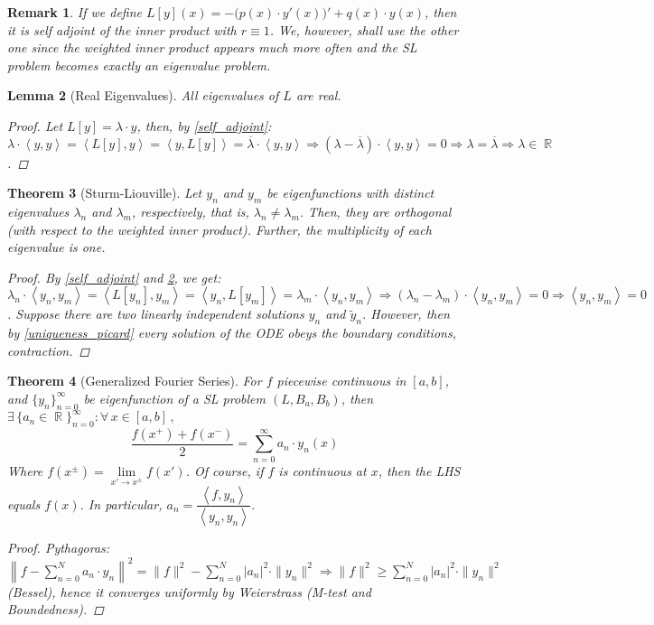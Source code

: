 \documentclass[12pt]{article}
\let\RA\Rightarrow
\newcommand{\Forall}[1]{\forall\,{#1}\,,\,}
\newcommand{\Exist}[1]{\exists\,{#1}:}
\DeclareMathOperator{\R}{\mathbb{R}}
\newcommand{\inner}[2]{\left\langle{#1},{#2}\right\rangle}
\newtheorem{theorem}{Theorem}[subsection]
\newtheorem{lemma}[theorem]{Lemma}
\newtheorem{remark}[theorem]{Remark}
\begin{document}
\begin{remark}
  If we define $L[y](x)=-\Big(p(x)\cdot y'(x)\Big)'+q(x)\cdot y(x)$, then it is self adjoint of the inner product with $r\equiv 1$. We, however, shall use the other one since the weighted inner product appears much more often and the SL problem becomes exactly an eigenvalue problem.
\end{remark}

\begin{lemma}[Real Eigenvalues]
  \label{real_eigen}
  All eigenvalues of $L$ are real.
  \begin{proof}
    Let $L[y]=\lambda\cdot y$, then, by \ref{self_adjoint}: $\lambda\cdot\inner{y}{y}=\inner{L[y]}{y}=\inner{y}{L[y]}=\overline{\lambda}\cdot\inner{y}{y}\RA(\lambda-\overline{\lambda})\cdot\inner{y}{y}=0\RA\lambda=\overline{\lambda}\RA \lambda\in\R$.
  \end{proof}
\end{lemma}

\begin{theorem}[Sturm-Liouville]
  Let $y_n$ and $y_m$ be eigenfunctions with distinct eigenvalues $\lambda_n$ and $\lambda_m$, respectively, that is, $\lambda_n\neq \lambda_m$. Then, they are orthogonal (with respect to the weighted inner product). Further, the multiplicity of each eigenvalue is one.
  \begin{proof}
    By \ref{self_adjoint} and \ref{real_eigen}, we get: $\lambda_n\cdot\inner{y_n}{y_m}=\inner{L[y_n]}{y_m}=\inner{y_n}{L[y_m]}=\lambda_m\cdot\inner{y_n}{y_m}\RA(\lambda_n-\lambda_m)\cdot\inner{y_n}{y_m}=0\RA\inner{y_n}{y_m}=0$. Suppose there are two linearly independent solutions $y_n$ and $\tilde{y}_n$. However, then by \ref{uniqueness_picard} every solution of the ODE obeys the boundary conditions, contraction.
  \end{proof}
\end{theorem}

\begin{theorem}[Generalized Fourier Series]
  For $f$ piecewise continuous in $[a,b]$, and $\{y_n\}_{n=0}^\infty$ be eigenfunction of a SL problem $(L,B_a,B_b)$, then $\Exist{\{a_n\in\R\}_{n=0}^\infty}\Forall{x\in[a,b]}$
  $$\frac{f(x^+)+f(x^-)}{2}=\sum_{n=0}^\infty a_n\cdot y_n(x)$$
  Where $f(x^{\pm})=\lim\limits_{x'\to x^{\pm}}f(x')$. Of course, if $f$ is continuous at $x$, then the LHS equals $f(x)$. In particular, $a_n=\dfrac{\inner{f}{y_n}}{\inner{y_n}{y_n}}$.
  \begin{proof}
    Pythagoras: $\left\|f-\sum_{n=0}^N a_n\cdot y_n\right\|^2=\|f\|^2-\sum_{n=0}^N |a_n|^2\cdot \|y_n\|^2\Rightarrow \|f\|^2\geq \sum_{n=0}^N |a_n|^2\cdot \|y_n\|^2$ (Bessel), hence it converges uniformly by Weierstrass (M-test and Boundedness).
  \end{proof}
\end{theorem}
\end{document}
